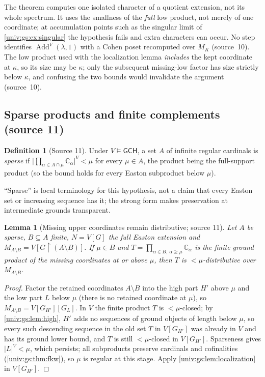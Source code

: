 \documentclass[11pt,letterpaper]{article}
\numberwithin{equation}{section}
\newtheorem{lemma}[lemma]{Lemma}
\theoremstyle{definition}
\newtheorem{definition}[definition]{Definition}
\theoremstyle{remark}
\newcommand{\Add}{\operatorname{Add}}
\newcommand{\res}{\mathbin{\upharpoonright}}
\newcommand{\abs}[1]{\lvert#1\rvert}
\newcommand{\GCH}{\mathsf{GCH}}
\begin{document}
The theorem computes one isolated character of a quotient extension, not its whole
spectrum. It uses the smallness of the \emph{full} low product, not merely of one
coordinate; at accumulation points such as the singular limit of
\cref{univ:gs:ex:singular} the hypothesis fails and extra characters can occur. No step
identifies $\Add^V(\lambda,1)$ with a Cohen poset recomputed over $M_K$ (source~10).
The low product used with the localization lemma \emph{includes} the kept coordinate at
$\kappa$, so its size may be $\kappa$; only the subsequent missing-low factor has size
strictly below $\kappa$, and confusing the two bounds would invalidate the argument
(source~10).

\subsection{Sparse products and finite complements (source 11)}

\begin{definition}[Source 11]\label{univ:gs:def:sparse}
Under $V\models\GCH$, a set $A$ of infinite regular cardinals is \emph{sparse} if
$\abs{\prod_{\alpha\in A\cap\mu}\mathbb C_\alpha}^V<\mu$ for every $\mu\in A$, the
product being the full-support product (so the bound holds for every Easton
subproduct below $\mu$).
\end{definition}

``Sparse'' is local terminology for this hypothesis, not a claim that every Easton set
or increasing sequence has it; the strong form makes preservation at intermediate
grounds transparent.

\begin{lemma}[Missing upper coordinates remain distributive; source 11]\label{univ:gs:lem:reldist}
Let $A$ be sparse, $B\subseteq A$ finite, $N=V[G]$ the full Easton extension and
$M_{A\setminus B}=V[G\res(A\setminus B)]$. If $\mu\in B$ and
$T=\prod_{\alpha\in B,\ \alpha\ge\mu}\mathbb C_\alpha$ is the finite ground product of the
missing coordinates at or above $\mu$, then $T$ is $<\mu$-distributive over
$M_{A\setminus B}$.
\end{lemma}
\begin{proof}
Factor the retained coordinates $A\setminus B$ into the high part $H'$ above $\mu$ and
the low part $L$ below $\mu$ (there is no retained coordinate at $\mu$), so
$M_{A\setminus B}=V[G_{H'}][G_L]$. In $V$ the finite product $T$ is $<\mu$-closed; by
\cref{univ:gs:lem:high}, $H'$ adds no sequences of ground objects of length below $\mu$,
so every such descending sequence in the old set $T$ in $V[G_{H'}]$ was already in $V$
and has its ground lower bound, and $T$ is still $<\mu$-closed in $V[G_{H'}]$.
Sparseness gives $\abs L^V<\mu$, which persists; all subproducts preserve cardinals and
cofinalities (\cref{univ:gs:thm:fkw}), so $\mu$ is regular at this stage. Apply
\cref{univ:gs:lem:localization} in $V[G_{H'}]$.
\end{proof}
\end{document}
